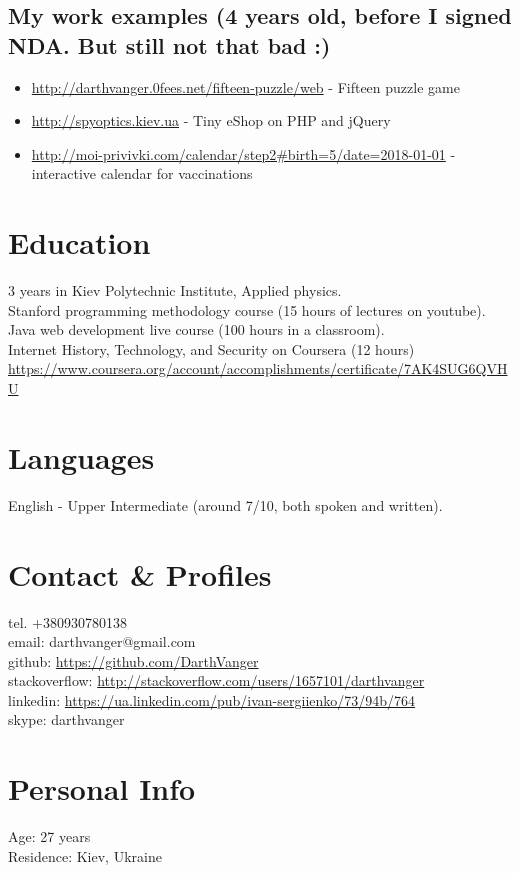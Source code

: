 \documentclass[a4paper, 14pt]{article}
\begin{document}
  \subsection{My work examples (4 years old, before I signed NDA. But still not that bad :)}
  \begin{itemize}
    \item \url{http://darthvanger.0fees.net/fifteen-puzzle/web} - Fifteen puzzle game
    \\
    \item \url{http://spyoptics.kiev.ua} - Tiny eShop on PHP and jQuery
    \\
    \item \url{http://moi-privivki.com/calendar/step2#birth=5/date=2018-01-01} - interactive calendar for vaccinations
  \end{itemize}

\section{Education}
	3 years in Kiev Polytechnic Institute, Applied physics. \\
	Stanford programming methodology course (15 hours of lectures on youtube). \\
	Java web development live course (100 hours in a classroom). \\
  Internet History, Technology, and Security on Coursera (12 hours) \url{https://www.coursera.org/account/accomplishments/certificate/7AK4SUG6QVHU}

\section{Languages}
	English - Upper Intermediate (around 7/10, both spoken and written).
\section{Contact \& Profiles}
	tel. +380930780138 \\
	email: darthvanger@gmail.com \\
  github: \url{https://github.com/DarthVanger} \\
  stackoverflow: \url{http://stackoverflow.com/users/1657101/darthvanger} \\
  linkedin: \url{https://ua.linkedin.com/pub/ivan-sergiienko/73/94b/764} \\
  skype: darthvanger
\section{Personal Info}
	Age: 27 years \\
	Residence: Kiev, Ukraine
\end{document}
